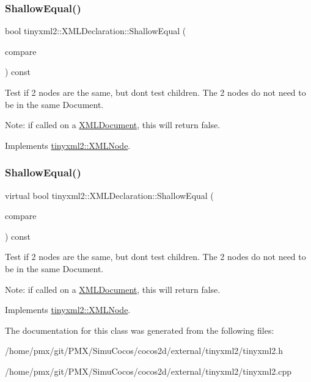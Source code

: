 \subsubsection{\texorpdfstring{Shallow\+Equal()}{ShallowEqual()}\hspace{0.1cm}{\footnotesize\ttfamily [1/2]}}
{\footnotesize\ttfamily bool tinyxml2\+::\+X\+M\+L\+Declaration\+::\+Shallow\+Equal (\begin{DoxyParamCaption}\item[{const \hyperlink{classtinyxml2_1_1XMLNode}{X\+M\+L\+Node} $\ast$}]{compare }\end{DoxyParamCaption}) const\hspace{0.3cm}{\ttfamily [virtual]}}

Test if 2 nodes are the same, but don\textquotesingle{}t test children. The 2 nodes do not need to be in the same Document.

Note\+: if called on a \hyperlink{classtinyxml2_1_1XMLDocument}{X\+M\+L\+Document}, this will return false. 

Implements \hyperlink{classtinyxml2_1_1XMLNode_a7ce18b751c3ea09eac292dca264f9226}{tinyxml2\+::\+X\+M\+L\+Node}.

\mbox{\label{classtinyxml2_1_1XMLDeclaration_aa26b70011694e9b9e9480b929e9b78d6}} 
\subsubsection{\texorpdfstring{Shallow\+Equal()}{ShallowEqual()}\hspace{0.1cm}{\footnotesize\ttfamily [2/2]}}
{\footnotesize\ttfamily virtual bool tinyxml2\+::\+X\+M\+L\+Declaration\+::\+Shallow\+Equal (\begin{DoxyParamCaption}\item[{const \hyperlink{classtinyxml2_1_1XMLNode}{X\+M\+L\+Node} $\ast$}]{compare }\end{DoxyParamCaption}) const\hspace{0.3cm}{\ttfamily [virtual]}}

Test if 2 nodes are the same, but don\textquotesingle{}t test children. The 2 nodes do not need to be in the same Document.

Note\+: if called on a \hyperlink{classtinyxml2_1_1XMLDocument}{X\+M\+L\+Document}, this will return false. 

Implements \hyperlink{classtinyxml2_1_1XMLNode_a7ce18b751c3ea09eac292dca264f9226}{tinyxml2\+::\+X\+M\+L\+Node}.



The documentation for this class was generated from the following files\+:\begin{DoxyCompactItemize}
\item 
/home/pmx/git/\+P\+M\+X/\+Simu\+Cocos/cocos2d/external/tinyxml2/tinyxml2.\+h\item 
/home/pmx/git/\+P\+M\+X/\+Simu\+Cocos/cocos2d/external/tinyxml2/tinyxml2.\+cpp\end{DoxyCompactItemize}
